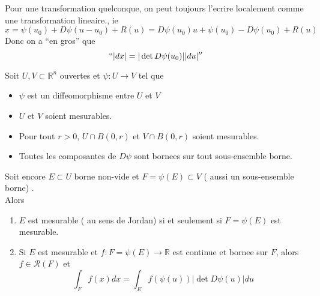 \documentclass[../main.tex]{subfiles}
\begin{document}
Pour une transformation quelconque, on peut toujours l'ecrire localement comme
une transformation lineaire., ie
\[ 
	x = \psi( u_0)  + D \psi ( u-u_0) + R( u) = D \psi( u_0) u + \psi( u_0 ) - D \psi( u_0)  + R( u) 
\]
Donc on a ``en gros'' que 
\[ 
	``|dx| = |\det D \psi( u_0)|| du|'' 
\]
\begin{thm}
Soit $U,V \subset \mathbb{R}^n$ ouvertes et $\psi: U \to V$ tel que
\begin{itemize}
\item $\psi$ est un diffeomorphisme entre $U$ et $V$
\item $U$ et $V$ soient mesurables.
\item Pour tout $r>0$, $U \cap B( 0,r) $ et $V \cap B( 0,r) $ soient mesurables.
\item Toutes les composantes de $D \psi$ sont bornees sur tout sous-ensemble borne.
\end{itemize}
Soit encore $E \subset U$ borne non-vide et $F = \psi( E)  \subset V$ (  aussi un sous-ensemble borne) .\\
Alors 
\begin{enumerate}
	\item $E$ est mesurable ( au sens de Jordan)  si et seulement si $F = \psi( E) $ est mesurable.
	\item Si $E$ est mesurable et $f: F = \psi( E) \to \mathbb{R}$ est continue et bornee sur $F$, alors $f \in \mathcal{R}( F) $ et 
\[ 
	\int_{ F }^{  }f( x) dx = \int_{ E }^{  } f( \psi( u) ) | \det D \psi( u) | du
\]
\end{enumerate}
\end{thm}
\end{document}
